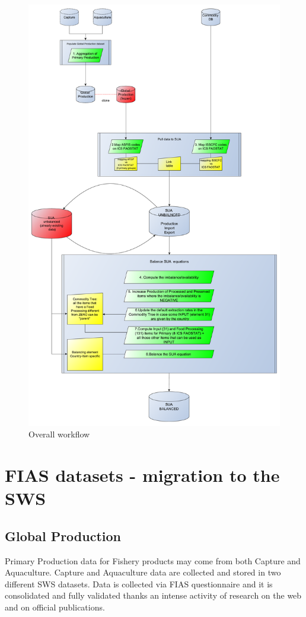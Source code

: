 \documentclass[nojss]{jss}
\begin{document}
\begin{figure}
\includegraphics{flow-charts/pullDataToSUA/pullDataToSUA_globalProdFROZEN.pdf}
\caption{Overall workflow}
\end{figure}




\section {FIAS datasets - migration to the SWS}

\subsection{Global Production}
Primary Production data for Fishery products may come from both Capture and Aquaculture. Capture and Aquaculture data are collected and stored in two different SWS datasets. Data is collected via FIAS questionnaire and it is consolidated and fully validated thanks an intense activity of research on the web and on official publications.
\end{document}
